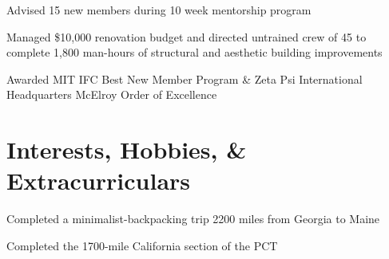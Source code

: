 \documentclass[letterpaper]{deedy-resume} %
\begin{document}
\begin{minipage}[t]{0.66\textwidth}
\sectionspace %



\begin{tightitemize}
\item Advised 15 new members during 10 week mentorship program
\item Managed \$10,000 renovation budget and directed untrained crew of 45 to complete 1,800 man-hours of structural and aesthetic building improvements
\item Awarded MIT IFC Best New Member Program \& Zeta Psi International Headquarters McElroy Order of Excellence
\end{tightitemize}

\sectionspace %


\section{Interests, Hobbies, \& Extracurriculars}


Completed a minimalist-backpacking trip 2200 miles from Georgia to Maine

Completed the 1700-mile California section of the PCT

\sectionspace %






\end{minipage}
\end{document}
